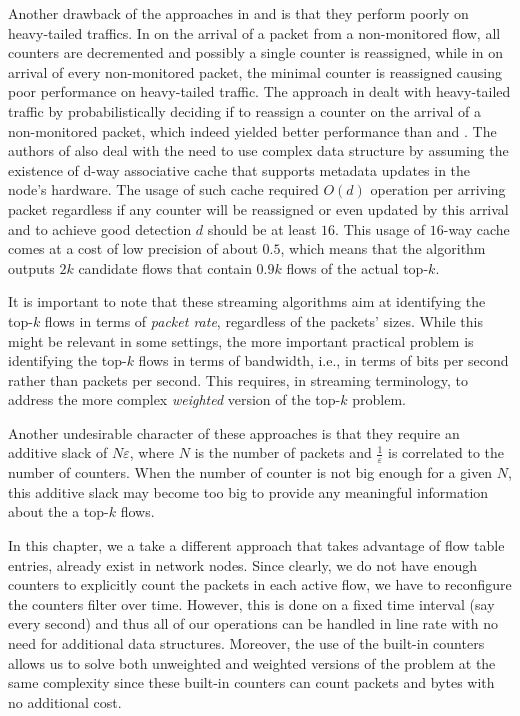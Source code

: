 Another drawback of the approaches in \cite{Demaine2002} and \cite{Metwally2005} is that they perform poorly on heavy-tailed traffics. In \cite{Demaine2002} on the arrival of a packet from a non-monitored flow, all counters are decremented and possibly a single counter is reassigned, while in \cite{Metwally2005} on arrival of every non-monitored packet, the minimal counter is reassigned causing poor performance on heavy-tailed traffic. The approach in \cite{Ben-Basat2017} dealt with heavy-tailed traffic by probabilistically deciding if to reassign a counter on the arrival of a non-monitored packet, which indeed yielded better performance than \cite{Demaine2002} and \cite{Metwally2005}. The authors of \cite{Ben-Basat2017} also deal with the need to use complex data structure by assuming the existence of d-way associative cache that supports metadata updates in the node’s hardware. The usage of such cache required $O(d)$ operation per arriving packet regardless if any counter will be reassigned or even updated by this arrival and to achieve good detection $d$ should be at least $16$. This usage of $16$-way cache comes at a cost of low precision of about $0.5$, which means that the algorithm outputs $2k$ candidate flows that contain $0.9k$ flows of the actual top-$k$.

It is important to note that these streaming algorithms aim at identifying the top-$k$ flows in terms of {\em packet rate}, regardless of the packets' sizes. While this might be relevant in some settings, the more important practical problem is identifying the top-$k$ flows in terms of bandwidth, i.e., in terms of bits per second rather than packets per second. This requires, in streaming terminology, to address the more complex {\em weighted} version of the top-$k$ problem.%

Another undesirable character of these approaches is that they require an additive slack of $N\varepsilon$, where $N$ is the number of packets and $\frac{1}{\varepsilon}$ is correlated to the number of counters. When the number of counter is not big enough for a given $N$, this additive slack may become too big to provide any meaningful information about the  a top-$k$ flows.

In this chapter, we a take a different approach that takes advantage of flow table entries, already exist in network nodes. Since clearly, we do not have enough counters to explicitly count the packets in each active flow, we have to reconfigure the counters filter over time. However, this is done on a fixed time interval (say every second) and thus all of our operations can be handled in line rate with no need for additional data structures. Moreover, the use of the built-in counters allows us to solve both unweighted and weighted versions of the problem at the same complexity since these built-in counters can count packets and bytes with no additional cost.


